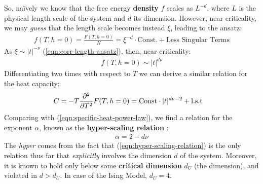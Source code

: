 \documentclass[../../main.tex]{subfiles}
\begin{document}
So, na\"ively we know that the free energy \textbf{density} $f$ scales as $L^{-d}$, where $L$ is the physical length scale of the system and $d$ its dimension. However, near criticality, we may \textit{guess} that the  length scale becomes instead $\xi$, leading to the ansatz:
\begin{align*}
    f(T, h=0) = \frac{F(T, h=0)}{N} = \xi^{-d} \cdot \text{Const.} + \text{Less Singular Terms} 
\end{align*} 
As $\xi \sim |t|^{-\nu}$ (\ref{eqn:corr-length-ansatz}), then, near criticality:
\begin{align*}
    f(T, h=0) \sim |t|^{d \nu}
\end{align*}
Differentiating two times with respect to $T$ we can derive a similar relation for the heat capacity:
\begin{align*}
    C = - T \pdv[2]{T} F(T, h=0) &= \text{Const} \cdot |t|^{d \nu - 2} + \text{l.s.t} 
\end{align*}
Comparing with (\ref{eqn:specific-heat-power-law}), we find a relation for the exponent $\alpha$, known as the \textbf{hyper-scaling relation} :
\begin{align}\label{eqn:hyper-scaling-relation}
    \alpha = 2 - d \nu
\end{align}
The \textit{hyper} comes from the fact that (\ref{eqn:hyper-scaling-relation}) is the only relation thus far that \textit{explicitly} involves the dimension $d$ of the system. Moreover, it is known to hold only below some \textbf{critical dimension} $d_U$ (the  dimension), and violated in $d > d_U$. In case of the Ising Model, $d_U = 4$.
\end{document}
